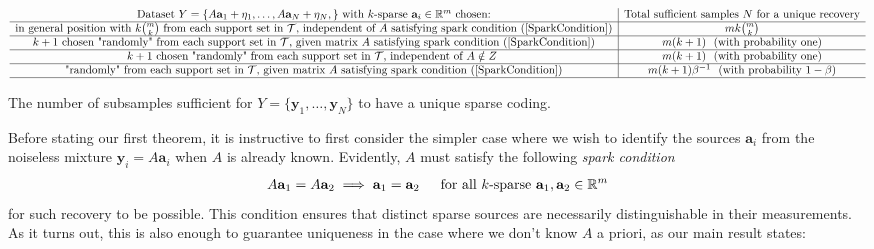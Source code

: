\documentclass[journal, onecolumn]{IEEEtran}
\begin{document}
\begin{table}\label{results}
\begin{center}
$\begin{array}{c|cc} \text{Dataset } Y = \{A\mathbf{a}_1 + \mathbf{\eta}_1, \ldots,A\mathbf{a}_N + \mathbf{\eta}_N,\} \text{ with $k$-sparse } \mathbf{a}_i \in \mathbb R^m \text{ chosen:}   & \text{Total sufficient samples } N \text{ for a unique recovery}  \\\hline 
\text{in general position with $k{m \choose k}$ from each support set in $\mathcal{T}$, independent of $A$ satisfying spark condition (\ref{SparkCondition})}  & mk{m \choose k} \\\hline     
 \text{$k+1$ chosen "randomly" from each support set in $\mathcal{T}$, given matrix $A$ satisfying spark condition (\ref{SparkCondition})}  & m(k+1) \ \ \text{(with probability one)} \\\hline 
\text{$k+1$ chosen "randomly" from each support set in $\mathcal{T}$, independent of $A \notin Z$ 
}  & m(k+1) \ \ \text{(with probability one)} \\\hline 
\text{"randomly" from each support set in $\mathcal{T}$, given matrix $A$ satisfying spark condition (\ref{SparkCondition})}  & m(k+1)\beta^{-1}\ \ \text{(with probability $1-\beta$)} \\\hline 
\end{array}$
\end{center}
\caption{The number of subsamples sufficient for $Y = \{\mathbf{y}_1, \ldots,\mathbf{y}_N\}$ to have a unique sparse coding.}
\label{table_N}
\vspace{-.3 in}
\end{table}

Before stating our first theorem, it is instructive to first consider the simpler case where we wish to identify the sources $\mathbf{a}_i$ from the noiseless mixture $\mathbf{y}_i = A\mathbf{a}_i$ when $A$ is already known. Evidently, $A$ must satisfy the following \emph{spark condition}
\begin{align}\label{SparkCondition}
A\mathbf{a}_1 = A\mathbf{a}_2 \implies \mathbf{a}_1 = \mathbf{a}_2 \indent \text{for all $k$-sparse } \mathbf{a}_1, \mathbf{a}_2 \in \mathbb{R}^m
\end{align}
%
for such recovery to be possible. This condition ensures that distinct sparse sources are necessarily distinguishable in their measurements. As it turns out, this is also enough to guarantee uniqueness in the case where we don't know $A$ a priori, as our main result states:
\end{document}

